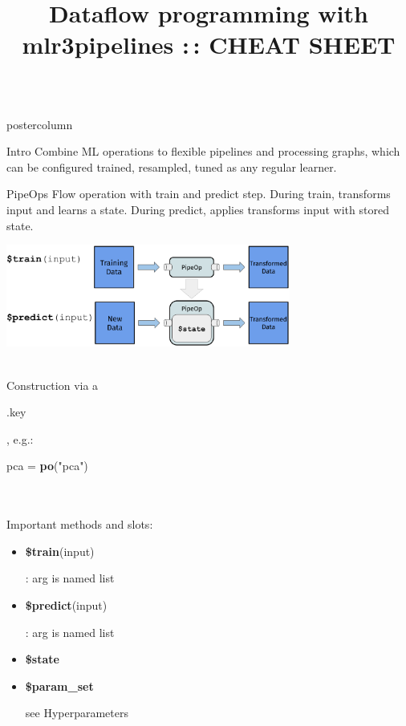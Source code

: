 \documentclass{beamer}
\title{Dataflow programming with mlr3pipelines :\,: CHEAT SHEET} %
\newlength{\columnheight} %
\newcommand{\codeinline}[1]{\begin{codeboxinline}#1\end{codeboxinline}}
\begin{document}
\begin{frame}[fragile]{}
	\begin{columns}
		\begin{column}{.245\textwidth}
			\begin{beamercolorbox}[center]{postercolumn}
				\begin{minipage}{.98\textwidth}
					\parbox[t][\columnheight]{\textwidth}{
						\begin{myblock}{Intro}
              Combine ML operations to flexible pipelines and processing graphs, 
              which can be configured trained, resampled, tuned as any regular learner.
            \end{myblock}
						\begin{myblock}{PipeOps}
              Flow operation with train and predict step. During train, transforms input and learns a state. During predict, applies transforms input with stored state.
              \begin{center}
                \includegraphics[width=0.7\textwidth]{img/po.pdf}
              \end{center}
              \ \\
              Construction via a \codeinline{.key}, e.g.: \codeinline{pca = \textbf{po}("pca")} \\
              \ \\
              Important methods and slots:
              \begin{itemize}
                \item \codeinline{\textbf{\$train}(input)}: arg is named list
                \item \codeinline{\textbf{\$predict}(input)}: arg is named list
                \item \codeinline{\textbf{\$state}} 
                \item \codeinline{\textbf{\$param\_set}} see Hyperparameters

\end{itemize}
\end{myblock}}
\end{minipage}
\end{beamercolorbox}
\end{column}
\end{columns}
\end{frame}
\end{document}
